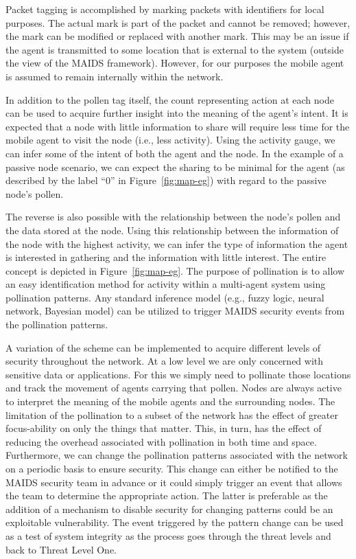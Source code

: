 \documentclass{acm_proc_article-sp}
\begin{document}
Packet tagging is accomplished by marking packets with identifiers for local purposes.  The actual mark is part of the packet and cannot be removed; however, the mark can be modified or replaced with another mark.  This may be an issue if the agent is transmitted to some location that is external to the system (outside the view of the MAIDS framework).  However, for our purposes the mobile agent is assumed to remain internally within the network.

In addition to the pollen tag itself, the count representing action at each node can be used to acquire further insight into the meaning of the agent's intent.  It is expected that a node with little information to share will require less time for the mobile agent to visit the node (i.e., less activity).  Using the activity gauge, we can infer some of the intent of both the agent and the node.  In the example of a passive node scenario, we can expect the sharing to be minimal for the agent (as described by the label ``0'' in Figure~\ref{fig:map-eg}) with regard to the passive node's pollen.

The reverse is also possible with the relationship between the node's pollen and the data stored at the node.  Using this relationship between the information of the node with the highest activity, we can infer the type of information the agent is interested in gathering and the information with little interest.  The entire concept is depicted in Figure~\ref{fig:map-eg}.  The purpose of pollination is to allow an easy identification method for activity within a multi-agent system using pollination patterns.  Any standard inference model (e.g., fuzzy logic, neural network, Bayesian model) can be utilized to trigger MAIDS security events from the pollination patterns.

A variation of the scheme can be implemented to acquire different levels of security throughout the network.  At a low level we are only concerned with sensitive data or applications.  For this we simply need to pollinate those locations and track the movement of agents carrying that pollen.  Nodes are always active to interpret the meaning of the mobile agents and the surrounding nodes.  The limitation of the pollination to a subset of the network has the effect of greater focus-ability on only the things that matter.  This, in turn, has the effect of reducing the overhead associated with pollination in both time and space.  Furthermore, we can change the pollination patterns associated with the network on a periodic basis to ensure security.  This change can either be notified to the MAIDS security team in advance or it could simply trigger an event that allows the team to determine the appropriate action.  The latter is preferable as the addition of a mechanism to disable security for changing patterns could be an exploitable vulnerability.  The event triggered by the pattern change can be used as a test of system integrity as the process goes through the threat levels and back to Threat Level One.
\end{document}
